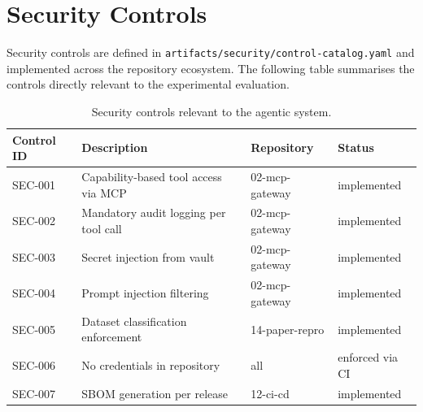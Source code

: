 \section{Security Controls}
\label{app:security-controls}

Security controls are defined in
\texttt{artifacts/security/control-catalog.yaml} and implemented across the
repository ecosystem. The following table summarises the controls directly
relevant to the experimental evaluation.

\begin{table}[ht]
\centering
\caption{Security controls relevant to the agentic system.}
\label{tab:security-controls}
\begin{tabular}{llll}
\toprule
Control ID & Description & Repository & Status \\
\midrule
SEC-001 & Capability-based tool access via MCP & 02-mcp-gateway & implemented \\
SEC-002 & Mandatory audit logging per tool call & 02-mcp-gateway & implemented \\
SEC-003 & Secret injection from vault & 02-mcp-gateway & implemented \\
SEC-004 & Prompt injection filtering & 02-mcp-gateway & implemented \\
SEC-005 & Dataset classification enforcement & 14-paper-repro & implemented \\
SEC-006 & No credentials in repository & all & enforced via CI \\
SEC-007 & SBOM generation per release & 12-ci-cd & implemented \\
\bottomrule
\end{tabular}
\end{table}
